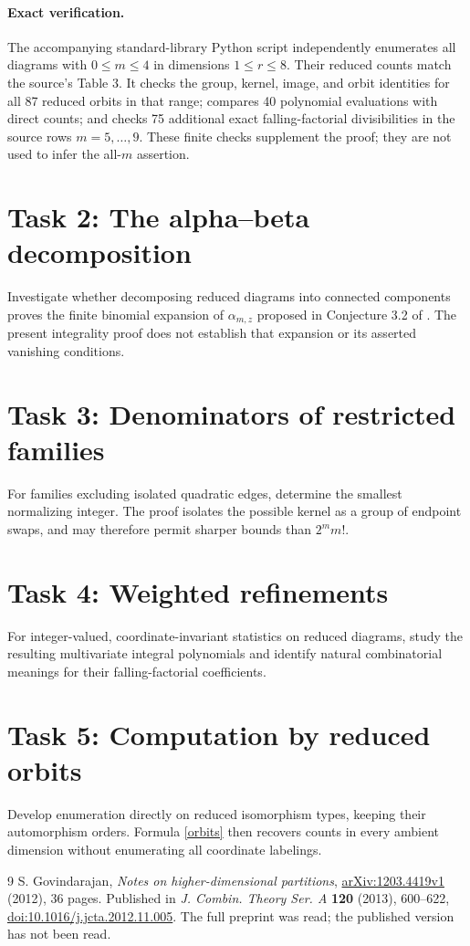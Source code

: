 \documentclass[11pt]{article}
\begin{document}
\paragraph{Exact verification.}
The accompanying standard-library Python script independently enumerates all
diagrams with $0\leq m\leq4$ in dimensions $1\leq r\leq8$. Their reduced
counts match the source's Table 3. It checks the group, kernel, image, and
orbit identities for all 87 reduced orbits in that range; compares 40
polynomial evaluations with direct counts; and checks 75 additional exact
falling-factorial divisibilities in the source rows $m=5,\ldots,9$.
These finite checks supplement the proof; they are not used to infer the
all-$m$ assertion.

\section*{Task 2: The alpha--beta decomposition}
Investigate whether decomposing reduced diagrams into connected components
proves the finite binomial expansion of $\alpha_{m,z}$ proposed in
Conjecture 3.2 of \cite{G}. The present integrality proof does not establish
that expansion or its asserted vanishing conditions.

\section*{Task 3: Denominators of restricted families}
For families excluding isolated quadratic edges, determine the smallest
normalizing integer. The proof isolates the possible kernel as a group of
endpoint swaps, and may therefore permit sharper bounds than $2^m m!$.

\section*{Task 4: Weighted refinements}
For integer-valued, coordinate-invariant statistics on reduced diagrams,
study the resulting multivariate integral polynomials and identify natural
combinatorial meanings for their falling-factorial coefficients.

\section*{Task 5: Computation by reduced orbits}
Develop enumeration directly on reduced isomorphism types, keeping their
automorphism orders. Formula \eqref{orbits} then recovers counts in every
ambient dimension without enumerating all coordinate labelings.

\begin{thebibliography}{9}
 S. Govindarajan, \emph{Notes on higher-dimensional partitions},
\href{https://arxiv.org/abs/1203.4419}{arXiv:1203.4419v1} (2012), 36 pages.
Published in \emph{J. Combin. Theory Ser. A} \textbf{120} (2013), 600--622,
\href{https://doi.org/10.1016/j.jcta.2012.11.005}{doi:10.1016/j.jcta.2012.11.005}.
The full preprint was read; the published version has not been read.
\end{thebibliography}
\end{document}
